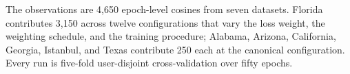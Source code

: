 The observations are 4,650 epoch-level cosines from seven datasets. Florida contributes 3,150 across
twelve configurations that vary the loss weight, the weighting schedule, and the training procedure;
Alabama, Arizona, California, Georgia, Istanbul, and Texas contribute 250 each at the canonical
configuration. Every run is five-fold user-disjoint cross-validation over fifty epochs.

